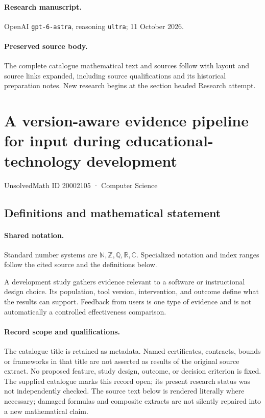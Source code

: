 \documentclass[11pt]{article}
\begin{document}
\paragraph{Research manuscript.} OpenAI \texttt{gpt-6-astra}, reasoning \texttt{ultra}; 11 October 2026.
\paragraph{Preserved source body.} The complete catalogue mathematical text and sources follow with layout and source links expanded, including source qualifications and its historical preparation notes. New research begins at the section headed Research attempt.

\section{A version-aware evidence pipeline for input during educational-technology development}\label{20002105}
{\small UnsolvedMath ID 20002105 · Computer Science}
\subsection{Definitions and mathematical statement}

\paragraph{Shared notation.}Standard number systems are $\mathbb N,\mathbb Z,\mathbb Q,\mathbb R,\mathbb C$. Specialized notation and index ranges follow the cited source and the definitions below.


A development study gathers evidence relevant to a software or instructional design choice. Its population, tool version, intervention, and outcome define what the results can support. Feedback from users is one type of evidence and is not automatically a controlled effectiveness comparison.
\paragraph{Record scope and qualifications.}
The catalogue title is retained as metadata. Named certificates, contracts, bounds or frameworks in that title are not asserted as results of the original source extract.
No proposed feature, study design, outcome, or decision criterion is fixed. The supplied catalogue marks this record open; its present research status was not independently checked.
The source text below is rendered literally where necessary; damaged formulas and composite extracts are not silently repaired into a new mathematical claim.
\end{document}
